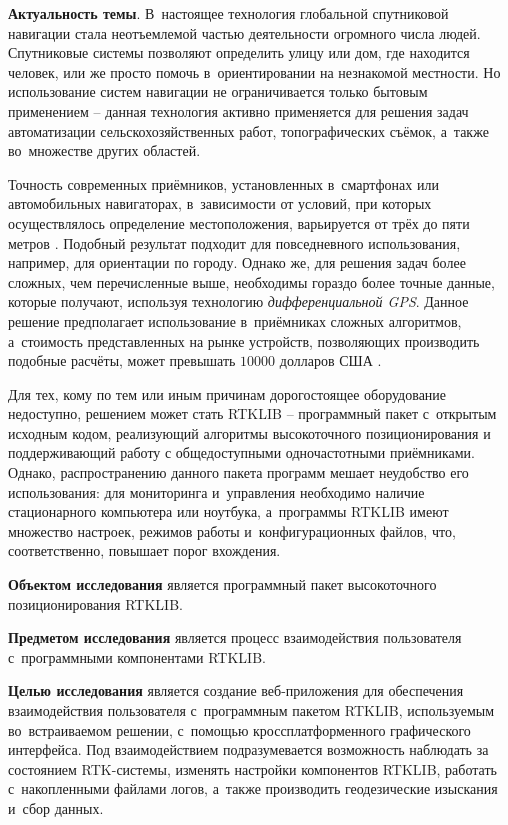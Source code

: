 
\textbf{Актуальность темы}. В~настоящее технология глобальной спутниковой навигации стала неотъемлемой частью деятельности огромного числа людей. Спутниковые системы позволяют определить улицу или дом, где находится человек, или же просто помочь в~ориентировании на незнакомой местности. Но использование систем навигации не ограничивается только бытовым применением -- данная технология активно применяется для решения задач автоматизации сельскохозяйственных работ, топографических съёмок, а~также во~множестве других областей.

Точность современных приёмников, установленных в~смартфонах или автомобильных навигаторах, в~зависимости от условий, при которых осуществлялось определение местоположения, варьируется от трёх до пяти метров \cite{GpsAccuracy,GpsGlonassAccuracy}. Подобный результат подходит для повседневного использования, например, для ориентации по городу. Однако же, для решения задач более сложных, чем перечисленные выше, необходимы гораздо более точные данные, которые получают, используя технологию \textit{дифференциальной GPS}. Данное решение предполагает использование в~приёмниках сложных алгоритмов, а~стоимость представленных на рынке устройств, позволяющих производить подобные расчёты, может превышать $10000$ долларов США \cite{GEOOPTIC,JAVAD}.

Для тех, кому по тем или иным причинам дорогостоящее оборудование недоступно, решением может стать RTKLIB \cite{RTKLIB} -- программный пакет с~открытым исходным кодом, реализующий алгоритмы высокоточного позиционирования и поддерживающий работу с общедоступными одночастотными приёмниками. Однако, распространению данного пакета программ мешает неудобство его использования: для мониторинга и~управления необходимо наличие стационарного компьютера или ноутбука, а~программы RTKLIB имеют множество настроек, режимов работы и~конфигурационных файлов, что, соответственно, повышает порог вхождения.

\textbf{Объектом исследования} является программный пакет высокоточного позиционирования RTKLIB.

\textbf{Предметом исследования} является процесс взаимодействия пользователя с~программными компонентами RTKLIB.

\textbf{Целью исследования} является создание веб-приложения для обеспечения взаимодействия пользователя с~программным пакетом RTKLIB, используемым во~встраиваемом решении, с~помощью кроссплатформенного графического интерфейса. Под взаимодействием подразумевается возможность наблюдать за состоянием RTK-системы, изменять настройки компонентов RTKLIB, работать с~накопленными файлами логов, а~также производить геодезические изыскания и~сбор данных.

